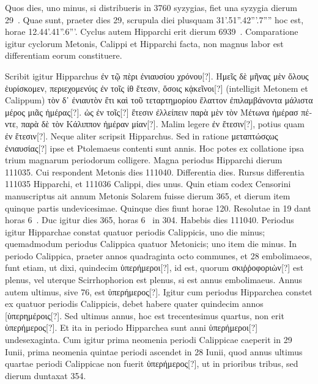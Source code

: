 Quos dies, uno minus, si distribueris in
3760 syzygias, fiet una syzygia dierum 29~.
Quae sunt, praeter dies
29, scrupula diei plusquam 31'.51''.42'''.7'''' hoc est, horae 12.44'.41''.6'''.
Cyclus autem Hipparchi erit dierum 6939~.
Comparatione
igitur cyclorum  Metonis, Calippi et Hipparchi facta, non magnus
labor est differentiam eorum  constituere.
%
\begin{table}[htbp]
  
\end{table}
%
Scribit igitur Hipparchus
\textgreek{ἐν τῷ πὲρι ἐνιαυσίου χρόνου[?]}.
\textgreek{Ημεῖς δὲ μῆνας μὲν ὅλους ἑυρίσκομεν, περιεχομενύις
ἐν τοῖς ίθ ἔτεσιν, ὅσοις κᾀκεῖνοι[?]} (intelligit Metonem et Calippum)
\textgreek{τὸν δ᾽ ἐνιαυτὸν ἔτι καὶ τοῦ τεταρτημορίου
ἔλαττον ἐπιλαμβάνοντα μάλιστα μέρος
μιᾶς ἡμέρας[?]}.
\textgreek{ὡς ἐν τοῖς[?]  ἔτεσιν ἐλλείπειν παρὰ
μὲν τὸν Μέτωνα ἡμέρασ πέντε, παρὰ δὲ
τὸν Κάλιππον ἡμέραν μίαν[?]}.
Malim legere
\textgreek{ἐν  ἔτεσιν[?]},
potius quam \textgreek{ἐν  ἔτεσιν[?]}.
Neque aliter scripsit Hipparchus.
Sed
in ratione \textgreek{μεταπτώσςως ἐνιαυσίας[?]} ipse et
Ptolemaeus contenti sunt  annis.
Hoc potes ex collatione ipsa trium magnarum
periodorum colligere.
Magna
periodus Hipparchi dierum 111035.
Cui respondent Metonis dies 111040.
Differentia  dies.
Rursus differentia
111035 Hipparchi, et 111036 Calippi,
dies unus.
Quin etiam codex Censorini
manuscriptus ait annum Metonis Solarem fuisse dierum 365, et
dierum item quinque partis undevicesimae.
Quinque dies fiunt
horae 120.
Resolutae in 19 dant horas 6~.
Duc igitur dies 365, horas
6~ in 304.
Habebis dies 111040.
Periodus igitur Hipparchae constat
quatuor periodis Calippicis, uno die minus; quemadmodum periodus
Calippica quatuor Metonicis; uno item die minus.
In periodo
Calippica, praeter annos quadraginta octo communes, et 28 embolimaeos,
funt etiam, ut dixi, quindecim \textgreek{ὑπερήμεροι[?]},
 id est, quorum \textgreek{σκιῤῥοφοριὼν[?]}
est plenus, vel uterque Scirrhophorion est plenus, si est annus
embolimaeus.
Annus autem ultimus, sive 76, est \textgreek{ὑπερήμερος[?]}.
Igitur
cum periodus Hipparchea constet ex quatuor periodis Calippicis, debet
habere quater quindecim annos \textgreek{[ὑπερημέροις[?]}.
Sed ultimus annus,
hoc est trecentesimus quartus, non erit \textgreek{ὑπερήμερος[?]}.
Et ita in periodo
Hipparchea sunt anni \textgreek{ὑπερήμεροι[?]} undesexaginta.
Cum igitur prima
neomenia periodi Calippicae caeperit in 29 Iunii, prima neomenia
quintae periodi ascendet in 28 Iunii, quod annus ultimus quartae periodi
Calippicae non fuerit \textgreek{ὑπερήμερος[?]},
 ut in prioribus tribus, sed dierum
duntaxat 354.

